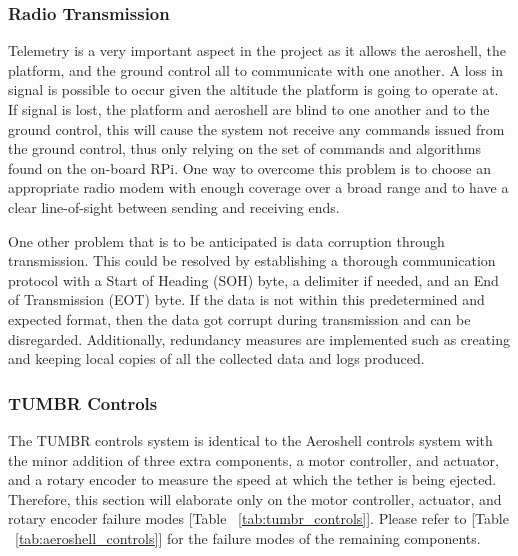 \subsubsection*{Radio Transmission}

\indent\indent Telemetry is a very important aspect in the project as it allows the aeroshell, the platform, and the ground control all to communicate with one another. A loss in signal is possible to occur given the altitude the platform is going to operate at. If signal is lost, the platform and aeroshell are blind to one another and to the ground control, this will cause the system not receive any commands issued from the ground control, thus only relying on the set of commands and algorithms found on the on-board RPi. One way to overcome this problem is to choose an appropriate radio modem with enough coverage over a broad range and to have a clear line-of-sight between sending and receiving ends.

One other problem that is to be anticipated is data corruption through transmission. This could be resolved by establishing a thorough communication protocol with a Start of Heading (SOH) byte, a delimiter if needed, and an End of Transmission (EOT) byte. If the data is not within this predetermined and expected format, then the data got corrupt during transmission and can be disregarded. Additionally, redundancy measures are implemented such as creating and keeping local copies of all the collected data and logs produced.


\subsubsection{\label{sss:tumbr_controls} TUMBR Controls}

\indent\indent The TUMBR controls system is identical to the Aeroshell controls system with the minor addition of three extra components, a motor controller, and actuator, and a rotary encoder to measure the speed at which the tether is being ejected. Therefore, this section will elaborate only on the motor controller, actuator, and rotary encoder failure modes [Table ~\ref{tab:tumbr_controls}]. Please refer to [Table ~\ref{tab:aeroshell_controls}] for the failure modes of the remaining components.

